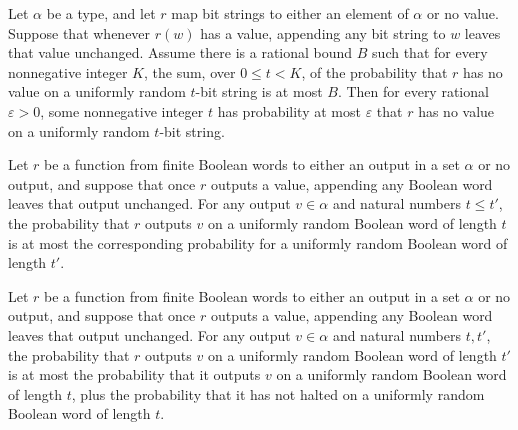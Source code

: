 \begin{theorem}
\label{Randomized.exists_notHaltedProb_le}
\leanok
{}
Let $\alpha$ be a type, and let $r$ map bit strings to either an element of $\alpha$ or
no value. Suppose that whenever $r(w)$ has a value, appending any bit string to $w$
leaves that value unchanged. Assume there is a rational bound $B$ such that for every
nonnegative integer $K$, the sum, over $0\le t<K$, of the probability that $r$ has no
value on a uniformly random $t$-bit string is at most $B$. Then for every rational
$\varepsilon>0$, some nonnegative integer $t$ has probability at most $\varepsilon$ that
$r$ has no value on a uniformly random $t$-bit string.
\end{theorem}

\begin{theorem}
\label{Randomized.randProb_eq_some_mono}
\leanok
{}
Let $r$ be a function from finite Boolean words to either an output in a set $\alpha$ or
no output, and suppose that once $r$ outputs a value, appending any Boolean word leaves
that output unchanged. For any output $v\in\alpha$ and natural numbers $t\le t'$, the
probability that $r$ outputs $v$ on a uniformly random Boolean word of length $t$ is at
most the corresponding probability for a uniformly random Boolean word of length $t'$.
\end{theorem}

\begin{theorem}
\label{Randomized.randProb_eq_some_le}
\leanok
{}
Let $r$ be a function from finite Boolean words to either an output in a set $\alpha$ or
no output, and suppose that once $r$ outputs a value, appending any Boolean word leaves
that output unchanged. For any output $v\in\alpha$ and natural numbers $t,t'$, the
probability that $r$ outputs $v$ on a uniformly random Boolean word of length $t'$ is at
most the probability that it outputs $v$ on a uniformly random Boolean word of length
$t$, plus the probability that it has not halted on a uniformly random Boolean word of
length $t$.
\end{theorem}

